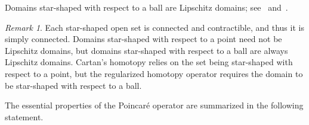 \documentclass[10pt,a4paper]{amsart}
\theoremstyle{definition}
\theoremstyle{remark}
\newtheorem{remark}[theorem]{Remark}
\numberwithin{equation}{section}
\begin{document}
Domains star-shaped with respect to a ball are Lipschitz domains; see~\cite[Lemma~3.15]{lewicka2023calculus} and~\cite[Lemma~2]{melzak1959class}.


\begin{remark}\label{remark:star-shaped}
    Each star-shaped open set is connected and contractible, and thus it is simply connected. 
    Domains star-shaped with respect to a point need not be Lipschitz domains, but domains star-shaped with respect to a ball are always Lipschitz domains. 
    Cartan's homotopy relies on the set being star-shaped with respect to a point, 
    but the regularized homotopy operator requires the domain to be star-shaped with respect to a ball. 
\end{remark}

The essential properties of the Poincar\'e operator are summarized in the following statement.
\end{document}
